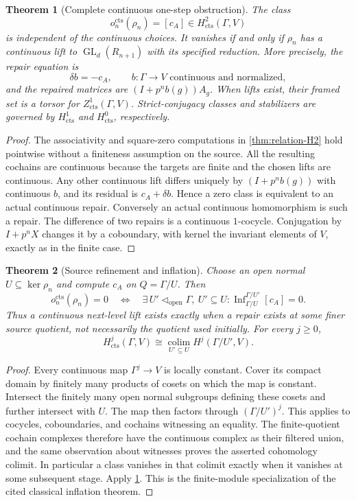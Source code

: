 \documentclass[11pt]{article}
\newtheorem{theorem}{Theorem}[section]
\theoremstyle{definition}
\theoremstyle{remark}
\begin{document}
\begin{theorem}[Complete continuous one-step obstruction]\label{thm:continuous-H2}
The class
\[
 o_n^{\mathrm{cts}}(\rho_n)=[c_A]\in H^2_{\mathrm{cts}}(\Gamma,V)
\]
is independent of the continuous choices. It vanishes if and only if $\rho_n$ has a \emph{continuous} lift to $\operatorname{GL}_d(R_{n+1})$ with its specified reduction. More precisely, the repair equation is
\[
 \delta b=-c_A,\qquad b:\Gamma\to V\text{ continuous and normalized},
\]
and the repaired matrices are $(I+p^nb(g))A_g$. When lifts exist, their framed set is a torsor for $Z^1_{\mathrm{cts}}(\Gamma,V)$. Strict-conjugacy classes and stabilizers are governed by $H^1_{\mathrm{cts}}$ and $H^0_{\mathrm{cts}}$, respectively.
\end{theorem}
\begin{proof}
The associativity and square-zero computations in \cref{thm:relation-H2} hold pointwise without a finiteness assumption on the source. All the resulting cochains are continuous because the targets are finite and the chosen lifts are continuous. Any other continuous lift differs uniquely by $(I+p^nb(g))$ with continuous $b$, and its residual is $c_A+\delta b$. Hence a zero class is equivalent to an actual continuous repair. Conversely an actual continuous homomorphism is such a repair. The difference of two repairs is a continuous $1$-cocycle. Conjugation by $I+p^nX$ changes it by a coboundary, with kernel the invariant elements of $V$, exactly as in the finite case.
\end{proof}

\begin{theorem}[Source refinement and inflation]\label{thm:source-inflation}
Choose an open normal $U\subseteq\ker\rho_n$ and compute $c_A$ on $Q=\Gamma/U$. Then
\[
 o_n^{\mathrm{cts}}(\rho_n)=0
 \quad\Longleftrightarrow\quad
 \exists\, U'\triangleleft_{\mathrm{open}}\Gamma,\ U'\subseteq U:
 \operatorname{Inf}_{\Gamma/U}^{\Gamma/U'}[c_A]=0.
\]
Thus a continuous next-level lift exists exactly when a repair exists at \emph{some finer source quotient}, not necessarily the quotient used initially. For every $j\geq0$,
\[
 H^j_{\mathrm{cts}}(\Gamma,V)
 \cong\underset{U'\subseteq U}{\operatorname{colim}}
 H^j(\Gamma/U',V).
\]
\end{theorem}
\begin{proof}
Every continuous map $\Gamma^j\to V$ is locally constant. Cover its compact domain by finitely many products of cosets on which the map is constant. Intersect the finitely many open normal subgroups defining these cosets and further intersect with $U$. The map then factors through $(\Gamma/U')^j$. This applies to cocycles, coboundaries, and cochains witnessing an equality. The finite-quotient cochain complexes therefore have the continuous complex as their filtered union, and the same observation about witnesses proves the asserted cohomology colimit. In particular a class vanishes in that colimit exactly when it vanishes at some subsequent stage. Apply \cref{thm:continuous-H2}. This is the finite-module specialization of the cited classical inflation theorem.
\end{proof}
\end{document}
